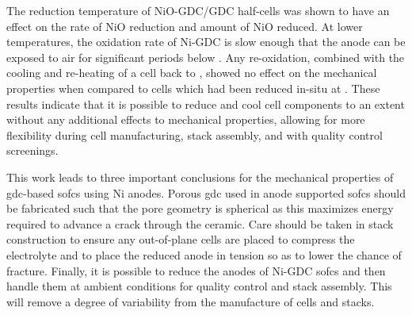 The reduction temperature of NiO-GDC/GDC half-cells was shown to have an effect on the rate of NiO reduction and amount of NiO reduced.
At lower temperatures, the oxidation rate of Ni-GDC is slow enough that the anode can be exposed to air for significant periods below .
Any re-oxidation, combined with the cooling and re-heating of a cell back to
, showed no effect on the mechanical properties when compared to cells which had been reduced in-situ at .
These results indicate that it is possible to reduce and cool cell components to an extent without any additional effects to mechanical properties, allowing for more flexibility during cell manufacturing, stack assembly, and with quality control screenings.

This work leads to three important conclusions for the mechanical properties of \gls{gdc}-based \glspl{sofc} using Ni anodes.
Porous \gls{gdc} used in anode supported \glspl{sofc} should be fabricated such that the pore geometry is spherical as this maximizes energy required to advance a crack through the ceramic.
Care should be taken in stack construction to ensure any out-of-plane cells are placed to compress the electrolyte and to place the reduced anode in tension so as to lower the chance of fracture.
Finally, it is possible to reduce the anodes of Ni-GDC \glspl{sofc} and then handle them at ambient conditions for quality control and stack assembly.
This will remove a degree of variability from the manufacture of cells and stacks.
